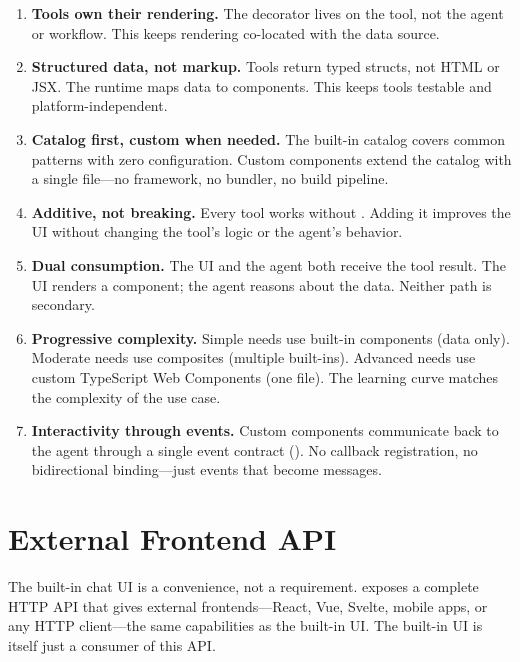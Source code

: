 \begin{enumerate}
    \item \textbf{Tools own their rendering.} The  decorator lives on the tool, not the agent or workflow. This keeps rendering co-located with the data source.

    \item \textbf{Structured data, not markup.} Tools return typed structs, not HTML or JSX. The runtime maps data to components. This keeps tools testable and platform-independent.

    \item \textbf{Catalog first, custom when needed.} The built-in catalog covers common patterns with zero configuration. Custom components extend the catalog with a single  file---no framework, no bundler, no build pipeline.

    \item \textbf{Additive, not breaking.} Every tool works without . Adding it improves the UI without changing the tool's logic or the agent's behavior.

    \item \textbf{Dual consumption.} The UI and the agent both receive the tool result. The UI renders a component; the agent reasons about the data. Neither path is secondary.

    \item \textbf{Progressive complexity.} Simple needs use built-in components (data only). Moderate needs use composites (multiple built-ins). Advanced needs use custom TypeScript Web Components (one  file). The learning curve matches the complexity of the use case.

    \item \textbf{Interactivity through events.} Custom components communicate back to the agent through a single event contract (). No callback registration, no bidirectional binding---just events that become messages.
\end{enumerate}

\section{External Frontend API}

The built-in chat UI is a convenience, not a requirement. \haira{} exposes a complete HTTP API that gives external frontends---React, Vue, Svelte, mobile apps, or any HTTP client---the same capabilities as the built-in UI. The built-in UI is itself just a consumer of this API.

